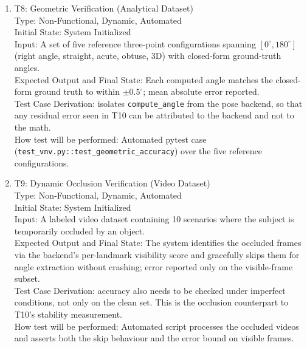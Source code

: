 \documentclass[12pt, titlepage]{article}
\begin{document}
\begin{enumerate}
\item{T8: Geometric Verification (Analytical Dataset)\\}
Type: Non-Functional, Dynamic, Automated\\
Initial State: System Initialized\\
Input: A set of five reference three-point configurations spanning
$[0^\circ, 180^\circ]$ (right angle, straight, acute, obtuse, 3D) with
closed-form ground-truth angles.\\
Expected Output and Final State: Each computed angle matches the
closed-form ground truth to within $\pm 0.5^\circ$; mean absolute error
reported.\\
Test Case Derivation: isolates \texttt{compute\_angle} from the pose
backend, so that any residual error seen in T10 can be attributed to
the backend and not to the math.\\
How test will be performed: Automated pytest case
(\texttt{test\_vnv.py::test\_geometric\_accuracy}) over the five reference
configurations.

\item{T9: Dynamic Occlusion Verification (Video Dataset)\\}
Type: Non-Functional, Dynamic, Automated\\
Initial State: System Initialized\\
Input: A labeled video dataset containing 10 scenarios where the subject
is temporarily occluded by an object.\\
Expected Output and Final State: The system identifies the occluded
frames via the backend's per-landmark visibility score and gracefully
skips them for angle extraction without crashing; error reported only on
the visible-frame subset.\\
Test Case Derivation: accuracy also needs to be checked under
imperfect conditions, not only on the clean set. This is the
occlusion counterpart to T10's stability measurement.\\
How test will be performed: Automated script processes the occluded videos
and asserts both the skip behaviour and the error bound on visible frames.


\end{enumerate}
\end{document}

